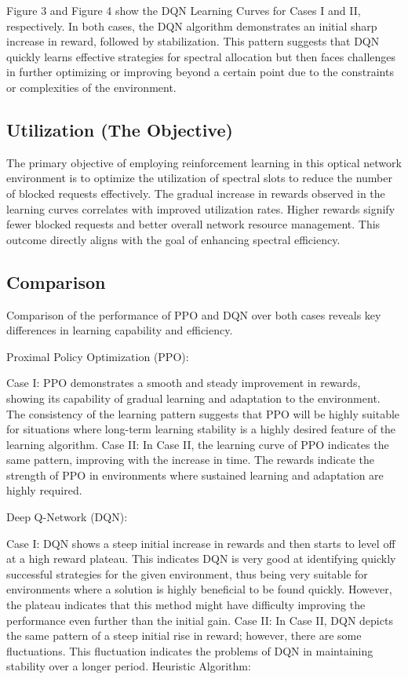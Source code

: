\documentclass[conference]{IEEEtran}
\begin{document}
Figure 3 and Figure 4 show the DQN Learning Curves for Cases I and II, respectively. In both cases, the DQN algorithm demonstrates an initial sharp increase in reward, followed by stabilization. This pattern suggests that DQN quickly learns effective strategies for spectral allocation but then faces challenges in further optimizing or improving beyond a certain point due to the constraints or complexities of the environment.

\subsection{Utilization (The Objective)}
The primary objective of employing reinforcement learning in this optical network environment is to optimize the utilization of spectral slots to reduce the number of blocked requests effectively. The gradual increase in rewards observed in the learning curves correlates with improved utilization rates. Higher rewards signify fewer blocked requests and better overall network resource management. This outcome directly aligns with the goal of enhancing spectral efficiency.

\subsection{Comparison}
Comparison of the performance of PPO and DQN over both cases reveals key differences in learning capability and efficiency.

Proximal Policy Optimization (PPO):

Case I: PPO demonstrates a smooth and steady improvement in rewards, showing its capability of gradual learning and adaptation to the environment. The consistency of the learning pattern suggests that PPO will be highly suitable for situations where long-term learning stability is a highly desired feature of the learning algorithm.
Case II: In Case II, the learning curve of PPO indicates the same pattern, improving with the increase in time. The rewards indicate the strength of PPO in environments where sustained learning and adaptation are highly required.

Deep Q-Network (DQN):

Case I: DQN shows a steep initial increase in rewards and then starts to level off at a high reward plateau. This indicates DQN is very good at identifying quickly successful strategies for the given environment, thus being very suitable for environments where a solution is highly beneficial to be found quickly. However, the plateau indicates that this method might have difficulty improving the performance even further than the initial gain.
Case II: In Case II, DQN depicts the same pattern of a steep initial rise in reward; however, there are some fluctuations. This fluctuation indicates the problems of DQN in maintaining stability over a longer period.
Heuristic Algorithm:
\end{document}
